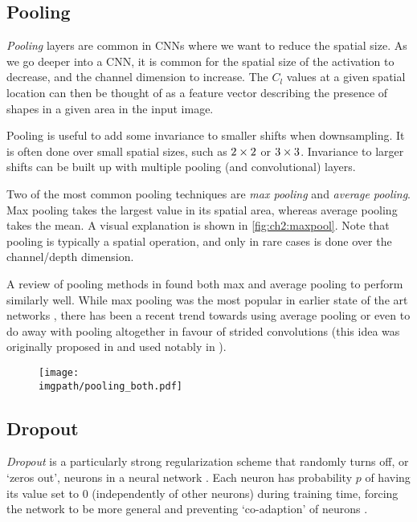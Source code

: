 \subsection{Pooling}
\emph{Pooling} layers are common in CNNs where we want to reduce the spatial size. As
we go deeper into a CNN, it is common for the spatial size of the activation to
decrease, and the channel dimension to increase. The $C_l$ values at a given
spatial location can then be thought of as a feature vector describing the
presence of shapes in a given area in the input image.

Pooling is useful to add some invariance to smaller shifts when downsampling. It
is often done over small spatial sizes, such as $2\times 2$ or $3\times 3$. Invariance
to larger shifts can be built up with multiple pooling (and convolutional) layers.

Two of the most common pooling techniques are \emph{max pooling} and
\emph{average pooling}. Max pooling takes the largest value in its spatial area,
whereas average pooling takes the mean. A visual explanation is shown in
\autoref{fig:ch2:maxpool}. Note that pooling is typically a spatial operation,
and only in rare cases is done over the channel/depth dimension.

A review of pooling methods in \cite{mishkin_systematic_2016} found both
max and average pooling to perform similarly well. While max pooling was the most
popular in earlier state of the art networks \cite{krizhevsky_imagenet_2012,
simonyan_very_2014}, there has been a recent trend towards using average pooling
\cite{huang_densely_2017} or even to do away with pooling altogether in favour
of strided convolutions (this idea was originally proposed in
\cite{springenberg_striving_2014-3} and used notably in \cite{he_deep_2016,
xie_aggregated_2017, zagoruyko_wide_2016-1}).

\begin{figure}
  \centering
  \texttt{[image: \\imgpath/pooling\_both.pdf]}
  \label{fig:ch2:maxpool}
\end{figure}

\subsection{Dropout}
\emph{Dropout} is a particularly strong regularization scheme that randomly turns off,
or `zeros out', neurons in a neural network \cite{hinton_improving_2012, srivastava_dropout:_2014}.
Each neuron has probability $p$ of having its value set to 0 (independently of
other neurons) during training
time, forcing the network to be more general and preventing `co-adaption' of
neurons \cite{srivastava_dropout:_2014}.

